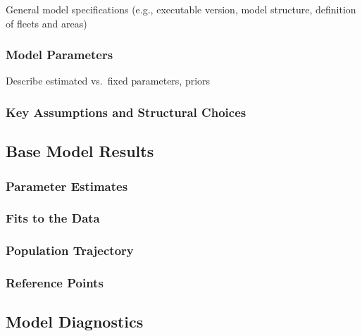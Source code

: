 \documentclass[11pt,
  english,
  letterpaper,
]{article}
\begin{document}
General model specifications (e.g., executable version, model structure, definition of fleets and areas)

\hypertarget{model-parameters}{%
\subsubsection{Model Parameters}\label{model-parameters}}

Describe estimated vs.~fixed parameters, priors

\hypertarget{key-assumptions-and-structural-choices}{%
\subsubsection{Key Assumptions and Structural Choices}\label{key-assumptions-and-structural-choices}}

\hypertarget{base-model-results}{%
\subsection{Base Model Results}\label{base-model-results}}

\hypertarget{parameter-estimates}{%
\subsubsection{Parameter Estimates}\label{parameter-estimates}}

\hypertarget{fits-to-the-data}{%
\subsubsection{Fits to the Data}\label{fits-to-the-data}}

\hypertarget{population-trajectory}{%
\subsubsection{Population Trajectory}\label{population-trajectory}}

\hypertarget{reference-points-1}{%
\subsubsection{Reference Points}\label{reference-points-1}}

\hypertarget{model-diagnostics}{%
\subsection{Model Diagnostics}\label{model-diagnostics}}
\end{document}
